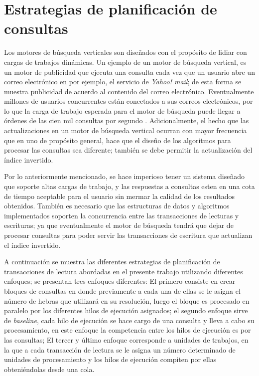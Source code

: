 \chapter{Estrategias de planificación de consultas}
\label{cap:planificacion}
Los motores de búsqueda verticales son diseñados con el propósito de lidiar con cargas de trabajos dinámicas. Un ejemplo de un motor de búsqueda vertical, es un motor de publicidad que ejecuta una consulta cada vez que un usuario abre un correo electrónico en por ejemplo, el servicio de \textit{Yahoo! mail}; de esta forma se muestra publicidad de acuerdo al contenido del correo electrónico. Eventualmente millones de usuarios concurrentes están conectados a sus correos electrónicos, por lo que la carga de trabajo esperada para el motor de búsqueda puede llegar a órdenes de las cien mil consultas por segundo \citep{Gil-Costa:2013}. Adicionalmente, el hecho que las actualizaciones en un motor de búsqueda vertical ocurran con mayor frecuencia que en uno de propósito general, hace que el diseño de los algoritmos para procesar las consultas sea diferente; también se debe permitir la actualización del índice invertido.

Por lo anteriormente mencionado, se hace imperioso tener un sistema diseñado que soporte altas cargas de trabajo, y las respuestas a consultas esten en una cota de tiempo aceptable para el usuario sin mermar la calidad de los resultados obtenidos. También es necesario que las estructuras de datos y algoritmos implementados soporten la concurrencia entre las transacciones de lecturas y escrituras; ya que eventualmente el motor de búsqueda tendrá que dejar de procesar consultas para poder servir las transacciones de escritura que actualizan el índice invertido.

A continuación se muestra las diferentes estrategias de planificación de transacciones de lectura abordadas en el presente trabajo utilizando diferentes enfoques; se presentan tres enfoques diferentes: El primero consiste en crear bloques de consultas en donde previamente a cada una de ellas se le asigna el número de hebras que utilizará en su resolución, luego el bloque es procesado en paralelo por los diferentes hilos de ejecución asignados; el segundo enfoque sirve de \textit{baseline}, cada hilo de ejecución se hace cargo de una consulta y lleva a cabo su procesamiento, en este enfoque la competencia entre los hilos de ejecución es por las consultas; El tercer y último enfoque corresponde a unidades de trabajos, en la que a cada transacción de lectura se le asigna un número determinado de unidades de procesamiento y los hilos de ejecución compiten por ellas obteniéndolas desde una cola.


